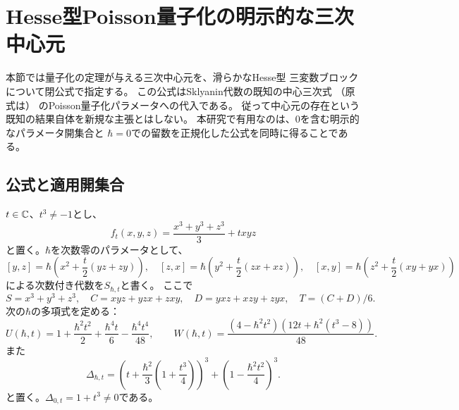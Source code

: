 \section{Hesse型Poisson量子化の明示的な三次中心元}
\label{sec:explicit-hesse-center}
本節では量子化の定理が与える三次中心元を、滑らかなHesse型
三変数ブロックについて閉公式で指定する。
この公式はSklyanin代数の既知の中心三次式
\cite[Theorem 1およびSection 2]{DeLaetLeBruyn}
（原式は\cite[p.~35, Remark (1)]{SmithTate}）
のPoisson量子化パラメータへの代入である。
従って中心元の存在という既知の結果自体を新規な主張とはしない。
本研究で有用なのは、$0$を含む明示的なパラメータ開集合と
$\hbar=0$での留数を正規化した公式を同時に得ることである。

\subsection{公式と適用開集合}
$t\in\mathbb C$、$t^3\ne-1$とし、
\[
 f_t(x,y,z)=\frac{x^3+y^3+z^3}{3}+txyz
\]
と置く。$\hbar$を次数零のパラメータとして、
\[
 [y,z]=\hbar\left(x^2+\frac{t}{2}(yz+zy)\right),
 \quad
 [z,x]=\hbar\left(y^2+\frac{t}{2}(zx+xz)\right),
 \quad
 [x,y]=\hbar\left(z^2+\frac{t}{2}(xy+yx)\right)
 \tag{H}\label{eq:hesse-commutators}
\]
による次数付き代数を$S_{\hbar,t}$と書く。
ここで
\[
 S=x^3+y^3+z^3,\quad
 C=xyz+yzx+zxy,\quad
 D=yxz+xzy+zyx,\quad T=(C+D)/6.
\]
次の$\hbar$の多項式を定める：
\[
 U(\hbar,t)=1+\frac{\hbar^2t^2}{2}
  +\frac{\hbar^4t}{6}-\frac{\hbar^4t^4}{48},
 \qquad
 W(\hbar,t)=
 \frac{(4-\hbar^2t^2)
 (12t+\hbar^2(t^3-8))}{48}.
 \tag{HU}\label{eq:hesse-UW}
\]
また
\[
 \Delta_{\hbar,t}=
 \left(t+\frac{\hbar^2}{3}
       \left(1+\frac{t^3}{4}\right)\right)^3
  +\left(1-\frac{\hbar^2t^2}{4}\right)^3.
 \tag{HD}\label{eq:hesse-discriminant}
\]
と置く。$\Delta_{0,t}=1+t^3\ne0$である。


